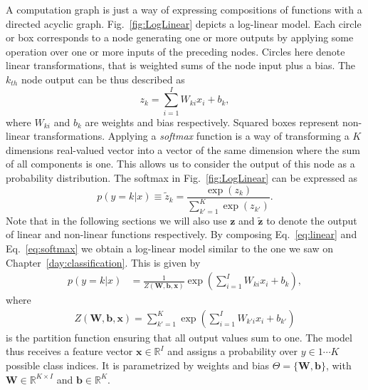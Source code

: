 A computation graph is just a way of expressing compositions of functions with
a directed acyclic graph. Fig.~\ref{fig:LogLinear} depicts a log-linear model.
Each circle or box corresponds to a node generating one or more outputs by
applying some operation over one or more inputs of the preceding nodes. Circles
here denote linear transformations, that is weighted sums of the node input
plus a bias. The $k_{th}$ node output can be thus described as
%
\begin{equation}
    z_k = \sum_{i=1}^{I} W_{ki} x_i + b_k,
\label{eq:linear}
\end{equation}
%
where $W_{ki}$ and $b_k$ are weights and bias respectively. Squared boxes
represent non-linear transformations. Applying a \textit{softmax} function is a
way of transforming a $K$ dimensions real-valued vector into a vector of the
same dimension where the sum of all components is one. This allows us to
consider the output of this node as a probability distribution. The softmax in
Fig.~\ref{fig:LogLinear} can be expressed as
%
\begin{equation}
p(y=k|{x}) \equiv \tilde{z}_k = \frac{\exp(z_k)}{\sum_{k'=1}^{K} \exp(z_{k'})}.
\label{eq:softmax}
\end{equation}
%
Note that in the following sections we will also use $\mathbf{z}$ and
$\tilde{\mathbf{z}}$ to denote the output of linear and non-linear functions
respectively. By composing Eq.~\ref{eq:linear} and Eq.~\ref{eq:softmax} we
obtain a log-linear model similar to the one we saw on
Chapter~\ref{day:classification}\footnotemark{}. This is given by
%
\begin{align}
p(y=k|{x}) & = \frac{1}{Z(\mathbf{W},\mathbf{b},\mathbf{x})}\exp\left(\sum_{i=1}^{I} W_{ki} x_i + b_k\right),
\label{eq:loglineargen}
\end{align}
%
\noindent where
\begin{align}
Z(\mathbf{W},\mathbf{b},\mathbf{x}) = \sum_{k'=1}^{K} \exp\left(\sum_{i=1}^{I} W_{k'i} x_i + b_{k'}\right)
\label{eq:loglineargenPartition}
\end{align}
%
is the partition function ensuring that all output values sum to one. The model thus receives a feature vector
$\mathbf{x} \in \mathbb{R}^{I}$ and assigns a probability over $y \in {1 \cdots K}$ possible
class indices. It is parametrized by weights and bias $\Theta=\{\mathbf{W},
\mathbf{b}\}$, with $\mathbf{W} \in \mathbb{R}^{K \times I}$ and $\mathbf{b}
\in \mathbb{R}^{K}$.


